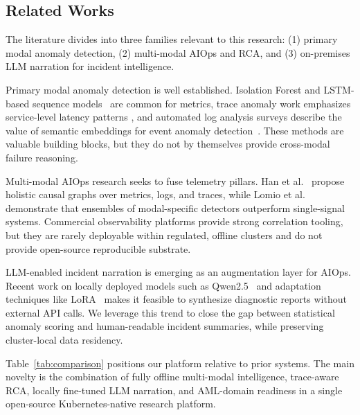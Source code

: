 \documentclass[a4paper]{lipics-v2021}
\begin{document}
\subsection{Related Works}

The literature divides into three families relevant to this research: (1) primary
modal anomaly detection, (2) multi-modal AIOps and RCA, and (3) on-premises LLM
narration for incident intelligence.

Primary modal anomaly detection is well established. Isolation Forest
\cite{liu2012isolation} and LSTM-based sequence models~\cite{malhotra2016lstm} are
common for metrics, trace anomaly work emphasizes service-level latency patterns
\cite{liu2020unsupervised}, and automated log analysis surveys describe the value of
semantic embeddings for event anomaly detection~\cite{he2021bert}. These methods
are valuable building blocks, but they do not by themselves provide cross-modal
failure reasoning.

Multi-modal AIOps research seeks to fuse telemetry pillars. Han et
al.~\cite{han2024holistic} propose holistic causal graphs over metrics, logs, and
traces, while Lomio et al.~\cite{lomio2022anomaly} demonstrate that ensembles of
modal-specific detectors outperform single-signal systems. Commercial observability
platforms provide strong correlation tooling, but they are rarely deployable within
regulated, offline clusters and do not provide open-source reproducible substrate.

LLM-enabled incident narration is emerging as an augmentation layer for AIOps.
Recent work on locally deployed models such as Qwen2.5~\cite{qwen2024} and adaptation
techniques like LoRA~\cite{hu2022lora} makes it feasible to synthesize diagnostic
reports without external API calls. We leverage this trend to close the gap between
statistical anomaly scoring and human-readable incident summaries, while preserving
cluster-local data residency.

Table~\ref{tab:comparison} positions our platform relative to prior systems. The
main novelty is the combination of fully offline multi-modal intelligence,
trace-aware RCA, locally fine-tuned LLM narration, and AML-domain readiness in a
single open-source Kubernetes-native research platform.
\end{document}

